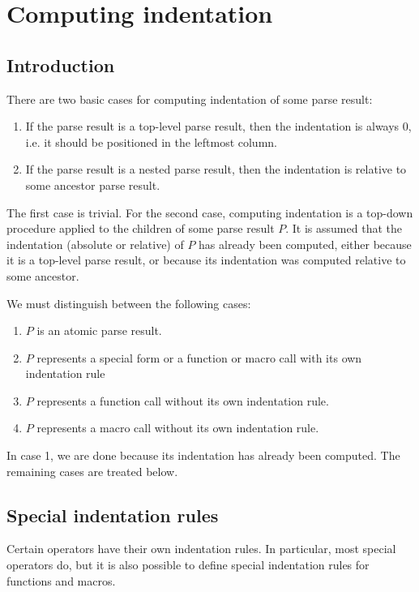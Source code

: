 \section{Computing indentation}
\label{sec-internals-common-lisp-mode-indentation}

\subsection{Introduction}

There are two basic cases for computing indentation of some parse
result:

\begin{enumerate}
\item If the parse result is a top-level parse result, then the
  indentation is always 0, i.e. it should be positioned in the
  leftmost column.
\item If the parse result is a nested parse result, then the
  indentation is relative to some ancestor parse result.
\end{enumerate}

The first case is trivial.  For the second case, computing indentation
is a top-down procedure applied to the children of some parse result
$P$.  It is assumed that the indentation (absolute or relative) of $P$
has already been computed, either because it is a top-level parse
result, or because its indentation was computed relative to some
ancestor.

We must distinguish between the following cases:

\begin{enumerate}
\item $P$ is an atomic parse result.
\item $P$ represents a special form or a function or macro call with
  its own indentation rule
\item $P$ represents a function call without its own indentation rule.
\item $P$ represents a macro call without its own indentation rule.
\end{enumerate}

In case 1,  we are done because its indentation has already been
computed.  The remaining cases are treated below.

\subsection{Special indentation rules}

Certain operators have their own indentation rules.  In particular,
most special operators do, but it is also possible to define special
indentation rules for functions and macros.

